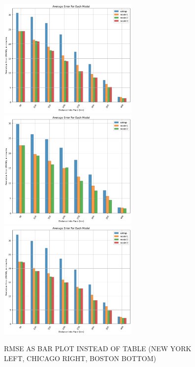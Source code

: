\documentclass[USenglish,twocolumn]{article}
\theoremstyle{dgthm}
\theoremstyle{dgdef}
\begin{document}
\begin{figure}[ht]
    \centering
    \includegraphics[width=2.7in]{../analysis/plots/nyc_rmse_bar.png}
    \includegraphics[width=2.7in]{../analysis/plots/chi_rmse_bar.png}
    \includegraphics[width=2.7in]{../analysis/plots/bos_rmse_bar.png}
    \caption{RMSE AS BAR PLOT INSTEAD OF TABLE (NEW YORK LEFT, CHICAGO RIGHT, BOSTON BOTTOM)}
\end{figure}
\end{document}
